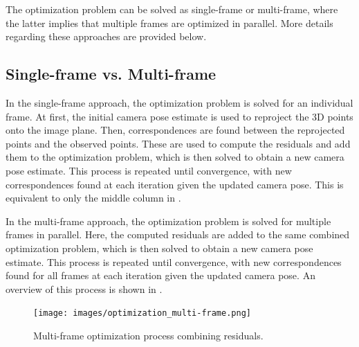The optimization problem can be solved as single-frame or multi-frame, where the latter implies that multiple frames are optimized in parallel. More details regarding these approaches are provided below.

\subsection{Single-frame vs. Multi-frame}


In the single-frame approach, the optimization problem is solved for an individual frame. At first, the initial camera pose estimate is used to reproject the 3D points onto the image plane. Then, correspondences are found between the reprojected points and the observed points. These are used to compute the residuals and add them to the optimization problem, which is then solved to obtain a new camera pose estimate. This process is repeated until convergence, with new correspondences found at each iteration given the updated camera pose. This is equivalent to only the middle column in .



In the multi-frame approach, the optimization problem is solved for multiple frames in parallel. Here, the computed residuals are added to the same combined optimization problem, which is then solved to obtain a new camera pose estimate. This process is repeated until convergence, with new correspondences found for all frames at each iteration given the updated camera pose. An overview of this process is shown in .

\begin{figure}[h]
    \centering
    \texttt{[image: images/optimization\_multi-frame.png]}
    \caption{Multi-frame optimization process combining residuals.}
    \label{fig:optimization_multi-frame}
\end{figure}